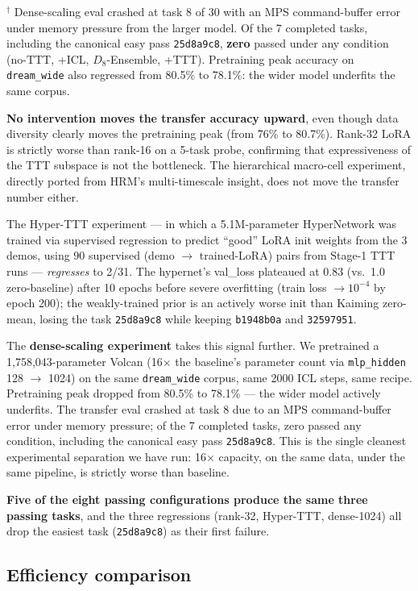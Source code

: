 \documentclass[11pt]{article}
\begin{document}
$^\dagger$ Dense-scaling eval crashed at task 8 of 30 with an MPS command-buffer error under memory pressure from the larger model. Of the 7 completed tasks, including the canonical easy pass \texttt{25d8a9c8}, \textbf{zero} passed under any condition (no-TTT, +ICL, $D_8$-Ensemble, +TTT). Pretraining peak accuracy on \texttt{dream\_wide} also regressed from 80.5\% to 78.1\%: the wider model underfits the same corpus.

\textbf{No intervention moves the transfer accuracy upward}, even though data diversity clearly moves the pretraining peak (from 76\% to 80.7\%). Rank-32 LoRA is strictly worse than rank-16 on a 5-task probe, confirming that expressiveness of the TTT subspace is not the bottleneck. The hierarchical macro-cell experiment, directly ported from HRM's multi-timescale insight, does not move the transfer number either.

The Hyper-TTT experiment --- in which a 5.1M-parameter HyperNetwork was trained via supervised regression to predict ``good'' LoRA init weights from the 3 demos, using 90 supervised (demo $\rightarrow$ trained-LoRA) pairs from Stage-1 TTT runs --- \emph{regresses} to 2/31. The hypernet's val\_loss plateaued at 0.83 (vs.\ 1.0 zero-baseline) after 10 epochs before severe overfitting (train loss $\to 10^{-4}$ by epoch 200); the weakly-trained prior is an actively worse init than Kaiming zero-mean, losing the task \texttt{25d8a9c8} while keeping \texttt{b1948b0a} and \texttt{32597951}.

The \textbf{dense-scaling experiment} takes this signal further. We pretrained a 1,758,043-parameter Volcan (16$\times$ the baseline's parameter count via \texttt{mlp\_hidden} 128 $\to$ 1024) on the same \texttt{dream\_wide} corpus, same 2000 ICL steps, same recipe. Pretraining peak dropped from 80.5\% to 78.1\% --- the wider model actively underfits. The transfer eval crashed at task 8 due to an MPS command-buffer error under memory pressure; of the 7 completed tasks, zero passed any condition, including the canonical easy pass \texttt{25d8a9c8}. This is the single cleanest experimental separation we have run: 16$\times$ capacity, on the same data, under the same pipeline, is strictly worse than baseline.

\textbf{Five of the eight passing configurations produce the same three passing tasks}, and the three regressions (rank-32, Hyper-TTT, dense-1024) all drop the easiest task (\texttt{25d8a9c8}) as their first failure.

\subsection{Efficiency comparison}
\end{document}
